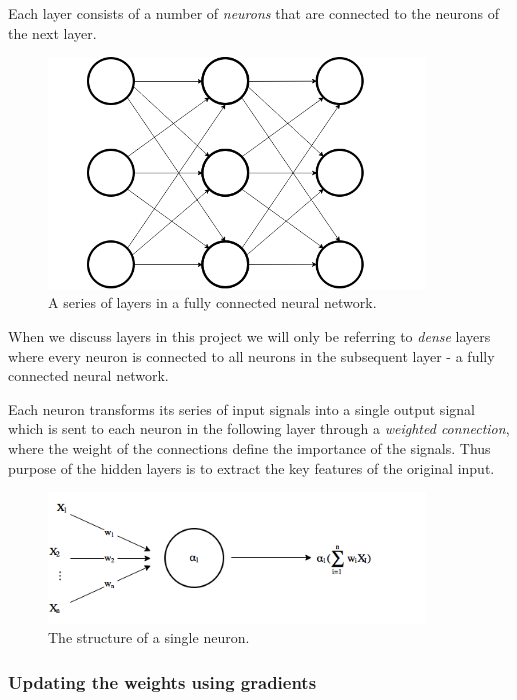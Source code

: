 \documentclass[11pt]{article}
\begin{document}
Each layer consists of a number of \textit{neurons} that are connected to the neurons of the
next layer.
\begin{figure}[!h]
    \centering
    \includegraphics[width=10cm]{include/layers.png}
    \caption{A series of layers in a fully connected neural network.}
    \label{fig:layers}
\end{figure}
When we discuss layers in this project we will only be referring to \textit{dense}
layers where every neuron is connected to all neurons in the subsequent layer - a fully
connected neural network.

Each neuron transforms its series of input signals into a single output signal which is sent to
each neuron in the following layer through a \textit{weighted connection}, where
the weight of the connections define the importance of the signals.
Thus purpose of the hidden layers is to extract the key features of the original input.
\begin{figure}[!h]
    \centering
    \includegraphics[width=10cm]{include/neuron.png}
    \caption{The structure of a single neuron.}
    \label{fig:neuron}
\end{figure}


\subsubsection{Updating the weights using gradients}
\end{document}
